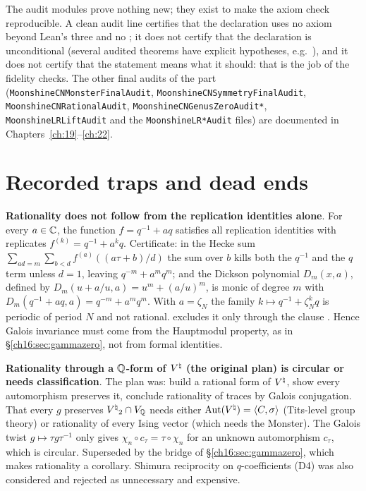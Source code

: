 The audit modules prove nothing new; they exist to make the axiom check reproducible.  A clean audit line certifies
that the declaration uses no axiom beyond Lean's three and no ; it does not certify that the declaration is
unconditional (several audited theorems have explicit hypotheses, e.g.\ ), and it does
not certify that the statement means what it should: that is the job of the fidelity checks.  The other final audits of
the part (\texttt{MoonshineCNMonsterFinalAudit}, \texttt{MoonshineCNSymmetryFinalAudit},
\texttt{MoonshineCNRationalAudit}, \texttt{MoonshineCNGenusZeroAudit*}, \texttt{MoonshineLRLiftAudit} and the
\texttt{MoonshineLR*Audit} files) are documented in Chapters~\ref{ch:19}--\ref{ch:22}.

\section{Recorded traps and dead ends}\label{ch16:sec:traps}

\begin{warning}
\textbf{Rationality does not follow from the replication identities alone}.  For
every $a\in{\mathbb{C}}$, the function $f=q^{-1}+aq$ satisfies all replication identities with replicates $f^{(k)}=q^{-1}+a^kq$.
Certificate: in the Hecke sum $\sum_{ad=m}\sum_{b<d}f^{(a)}((a\tau+b)/d)$ the sum over $b$ kills both the $q^{-1}$ and
the $q$ term unless $d=1$, leaving $q^{-m}+a^mq^m$; and the Dickson polynomial $D_m(x,a)$, defined by
$D_m(u+a/u,a)=u^m+(a/u)^m$, is monic of degree $m$ with $D_m(q^{-1}+aq,a)=q^{-m}+a^mq^m$.  With $a=\zeta_N$ the family
$k\mapsto q^{-1}+\zeta_N^kq$ is periodic of period $N$ and not rational.   excludes it only
through the clause .  Hence Galois invariance must come from the Hauptmodul property, as in
\S\ref{ch16:sec:gammazero}, not from formal identities.
\end{warning}

\begin{warning}
\textbf{Rationality through a ${\mathbb{Q}}$-form of ${V^{\natural}}$ (the original plan) is circular or needs classification}.
The plan was: build a rational form of
${V^{\natural}}$, show every automorphism preserves it, conclude rationality of traces by Galois conjugation.  That every $g$
preserves ${V^{\natural}}_2\cap V_{\mathbb{Q}}$ needs either $\operatorname{Aut}({V^{\natural}})=\langle C,\sigma\rangle$ (Tits-level group theory) or
rationality of every Ising vector (which needs the Monster).  The Galois twist $g\mapsto\tau g\tau^{-1}$ only gives
$\chi_n\circ c_\tau=\tau\circ\chi_n$ for an unknown automorphism $c_\tau$, which is circular.  Superseded by the bridge
of \S\ref{ch16:sec:gammazero}, which makes rationality a corollary.  Shimura reciprocity on $q$-coefficients (D4) was
also considered and rejected as unnecessary and expensive.
\end{warning}

